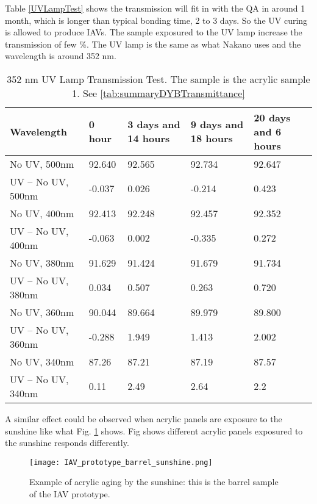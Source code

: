 



Table \ref{UVLampTest}
shows the transmission will fit in with the QA in around 1 month, which is longer than typical
bonding time, 2 to 3 days. So the UV curing is allowed to produce IAVs.
The sample exposured to the UV lamp increase the transmission of few \%.
The UV lamp is the same as what Nakano uses and the wavelength is around 352 nm.

\begin{table}
\centering
\caption{352 nm UV Lamp Transmission Test. The sample is the acrylic sample 1. See \ref{tab:summaryDYBTransmittance}}
\label{tab:UVLampTest}
\begin{tabular}{lp{2.5cm}p{2.5cm}p{2.5cm}p{2.5cm}}
\hline
Wavelength &  0 hour & 3 days and 14 hours & 9 days and 18 hours & 20 days and 6 hours \\
\hline
\hline
No UV, 500nm        &92.640  &92.565  &92.734  &92.647 \\
UV – No UV, 500nm   &-0.037  &0.026   &-0.214  &0.423\\
No UV, 400nm        &92.413  &92.248  &92.457  &92.352\\
UV – No UV, 400nm   &-0.063  &0.002   &-0.335  &0.272\\
No UV, 380nm        &91.629  &91.424  &91.679  &91.734\\
UV – No UV, 380nm   &0.034   &0.507   &0.263   &0.720\\
No UV, 360nm        &90.044  &89.664  &89.979  &89.800\\
UV – No UV, 360nm   &-0.288  &1.949   &1.413   &2.002\\
No UV, 340nm        &87.26   &87.21   &87.19   &87.57\\
UV – No UV, 340nm   &0.11    &2.49    &2.64    &2.2\\

\hline
\end{tabular}
\end{table}


A similar effect could be observed when acrylic panels are exposure to the sunshine like what
Fig. \ref{IAVPrototypeBarrelSunshineAging} shows. Fig shows different
acrylic panels exposured to the sunshine responds differently.


\begin{figure}
    \centering
    \texttt{[image: IAV\_prototype\_barrel\_sunshine.png]}
    \caption{Example of acrylic aging by the sunshine: this is the barrel sample of the IAV prototype.}
    \label{IAVPrototypeBarrelSunshineAging}
    \end{figure}



